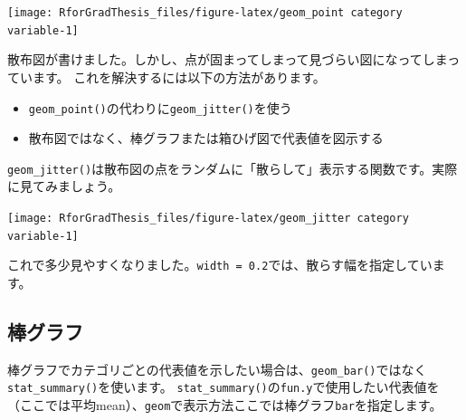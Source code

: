 \documentclass[]{book}
\newenvironment{Shaded}{\begin{snugshade}}{\end{snugshade}}
\newcommand{\KeywordTok}[1]{\textcolor[rgb]{0.13,0.29,0.53}{\textbf{#1}}}
\newcommand{\DataTypeTok}[1]{\textcolor[rgb]{0.13,0.29,0.53}{#1}}
\newcommand{\DecValTok}[1]{\textcolor[rgb]{0.00,0.00,0.81}{#1}}
\newcommand{\FloatTok}[1]{\textcolor[rgb]{0.00,0.00,0.81}{#1}}
\newcommand{\StringTok}[1]{\textcolor[rgb]{0.31,0.60,0.02}{#1}}
\newcommand{\OperatorTok}[1]{\textcolor[rgb]{0.81,0.36,0.00}{\textbf{#1}}}
\newcommand{\NormalTok}[1]{#1}
\providecommand{\tightlist}{%
  \setlength{\itemsep}{0pt}\setlength{\parskip}{0pt}}
\begin{document}
\begin{center}\texttt{[image: RforGradThesis\_files/figure-latex/geom\_point category variable-1]} \end{center}

散布図が書けました。しかし、点が固まってしまって見づらい図になってしまっています。
これを解決するには以下の方法があります。

\begin{itemize}
\tightlist
\item
  \texttt{geom\_point()}の代わりに\texttt{geom\_jitter()}を使う
\item
  散布図ではなく、棒グラフまたは箱ひげ図で代表値を図示する
\end{itemize}

\texttt{geom\_jitter()}は散布図の点をランダムに「散らして」表示する関数です。実際に見てみましょう。

\begin{Shaded}
\end{Shaded}

\begin{center}\texttt{[image: RforGradThesis\_files/figure-latex/geom\_jitter category variable-1]} \end{center}

これで多少見やすくなりました。\texttt{width\ =\ 0.2}では、散らす幅を指定しています。

\subsection{棒グラフ}\label{ux68d2ux30b0ux30e9ux30d5-1}

棒グラフでカテゴリごとの代表値を示したい場合は、\texttt{geom\_bar()}ではなく\texttt{stat\_summary()}を使います。
\texttt{stat\_summary()}の\texttt{fun.y}で使用したい代表値を（ここでは平均mean）、\texttt{geom}で表示方法ここでは棒グラフ\texttt{bar}を指定します。
\end{document}
